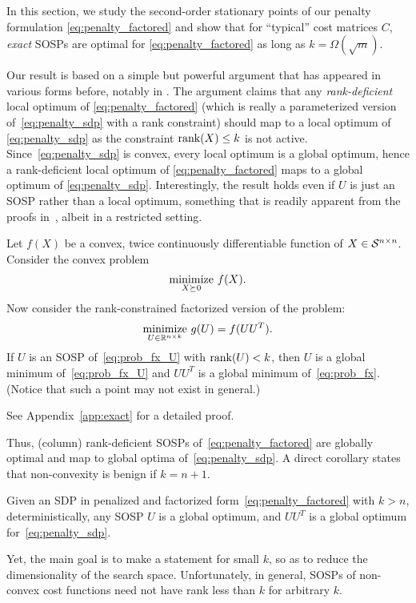 In this section, we study the second-order stationary points of our penalty formulation \eqref{eq:penalty_factored} and show that for ``typical'' cost matrices $C$, {\em exact} SOSPs are optimal for \eqref{eq:penalty_factored} as long as $k={\Omega}(\sqrt{m})$. 

Our result is based on 	a simple but powerful argument that has appeared in various forms before, notably in \citep{burer2005local}. The argument claims that any {\em rank-deficient} local optimum of \eqref{eq:penalty_factored} (which is really a parameterized version of~\eqref{eq:penalty_sdp} with a rank constraint) should map to a local optimum of \eqref{eq:penalty_sdp} as the constraint $\operatorname{rank}(X) \leq k$ is not active. Since~\eqref{eq:penalty_sdp} is convex, every local optimum is a global optimum, hence a rank-deficient local optimum of \eqref{eq:penalty_factored} maps to a global optimum of \eqref{eq:penalty_sdp}. Interestingly, the result holds even if $U$ is just an SOSP rather than a local optimum, something that is readily apparent from the proofs in~\citep{journee2010low}, albeit in a restricted setting.
\begin{lemma}\label{lem:global}
	Let $f(X)$ be a convex, twice continuously differentiable function of $X \in \mathcal{S}^{n\times n}$. Consider the convex problem
	\begin{align}
		\underset{X \succeq 0}{\operatorname*{\mathrm{minimize}}}~ f(X).
		\label{eq:prob_fx}
	\end{align}
	Now consider the rank-constrained factorized version of the problem:
	\begin{align}
		\underset{U \in \mathbb{R}^{n \times k}}{\operatorname*{\mathrm{minimize}}} ~ g(U) = f(UU^T).
		\label{eq:prob_fx_U}
	\end{align}
	If $U$ is an SOSP of~\eqref{eq:prob_fx_U} with $\operatorname{rank}(U) < k$, then $U$ is a global minimum of~\eqref{eq:prob_fx_U} and $UU^T$ is a global minimum of~\eqref{eq:prob_fx}. (Notice that such a point may not exist in general.)
\end{lemma}
See Appendix~\ref{app:exact} for a detailed proof. 

Thus, (column) rank-deficient SOSPs of~\eqref{eq:penalty_factored} are globally optimal and map to global optima of~\eqref{eq:penalty_sdp}. A direct corollary states that non-convexity is benign if $k = n+1$.
\begin{corollary}
	Given an SDP in penalized and factorized form~\eqref{eq:penalty_factored} with $k > n$, deterministically, any SOSP $U$ is a global optimum, and $UU^T$ is a global optimum for~\eqref{eq:penalty_sdp}.
\end{corollary}
Yet, the main goal is to make a statement for small $k$, so as to reduce the dimensionality of the search space. Unfortunately, in general, SOSPs of non-convex cost functions need not have rank less than $k$ for arbitrary $k$. 

